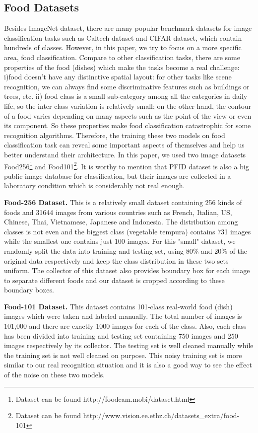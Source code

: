 \subsection{Food Datasets}
Besides ImageNet dataset, there are many popular benchmark datasets for image classification tasks such as Caltech dataset and CIFAR dataset, which contain hundreds of classes. However, in this paper, we try to focus on a more specific area, food classification. Compare to other classification tasks, there are some properties of the food (dishes) which make the tasks become a real challenge:  i)food doesn't have any distinctive spatial layout: for other tasks like scene recognition, we can always find some discriminative features such as buildings or trees, etc. ii) food class is a small sub-category among all the categories in daily life, so the inter-class variation is relatively small; on the other hand, the contour of a food varies depending on many aspects such as the point of the view or even its component. So these properties make food classification catastrophic for some recognition algorithms. Therefore, the training these two models on food classification task can reveal some important aspects of themselves and help us better understand their architecture. In this paper, we used two image datasets Food256\cite{kawano14c}\footnote{Dataset can be found http://foodcam.mobi/dataset.html} and Food101\cite{bossard14}\footnote{Dataset can be found http://www.vision.ee.ethz.ch/datasets\_extra/food-101}. It is worthy to mention that PFID dataset is also a big public image database for classification, but their images are collected in a laboratory condition which is considerably not real enough.

\textbf{Food-256 Dataset.}
This is a relatively small dataset containing 256 kinds of foods and 31644 images from various countries such as French, Italian, US, Chinese, Thai, Vietnamese, Japanese and Indonesia. The distribution among classes is not even and the biggest class (vegetable tempura) contains 731 images while the smallest one contains just 100 images. For this "small" dataset, we randomly split the data into training and testing set, using 80\% and 20\% of the original data respectively and keep the class distribution in these two sets uniform. The collector of this dataset also provides boundary box for each image to separate different foods and our dataset is cropped according to these boundary boxes.

\textbf{Food-101 Dataset.}
This dataset contains 101-class real-world food (dish) images which were taken and labeled manually. The total number of images is 101,000 and there are exactly 1000 images for each of the class. Also, each class has been divided into training and testing set containing 750 images and 250 images respectively by its collector. The testing set is well cleaned manually while the training set is not well cleaned on purpose. This noisy training set is more similar to our real recognition situation and it is also a good way to see the effect of the noise on these two models.


